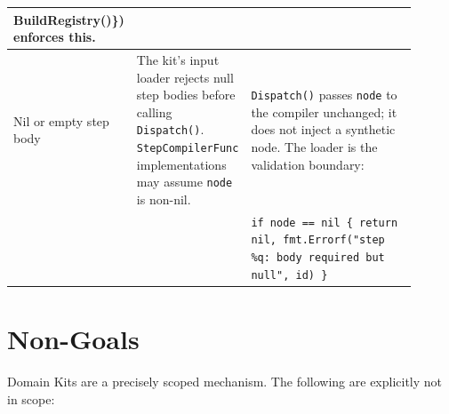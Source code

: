 \begin{table}[ht]
\begin{tabular}{p{0.20\linewidth}p{0.25\linewidth}p{0.45\linewidth}}
{  BuildRegistry()\}}) enforces this. \\
\midrule
Nil or empty step body &
  The kit's input loader rejects null step bodies before calling
  \texttt{Dispatch()}.  \texttt{StepCompilerFunc} implementations may assume
  \texttt{node} is non-nil. &
  \texttt{Dispatch()} passes \texttt{node} to the compiler unchanged; it does
  not inject a synthetic node.  The loader is the validation boundary: \\
  & &
  \texttt{if node == nil \{\ return nil,\ fmt.Errorf("step \%q:\ body required but null",\ id)\ \}} \\
\bottomrule
\end{tabular}
\end{table}

\section{Non-Goals}
\label{sec:kit-nongoals}

Domain Kits are a precisely scoped mechanism.  The following are explicitly not
in scope:

